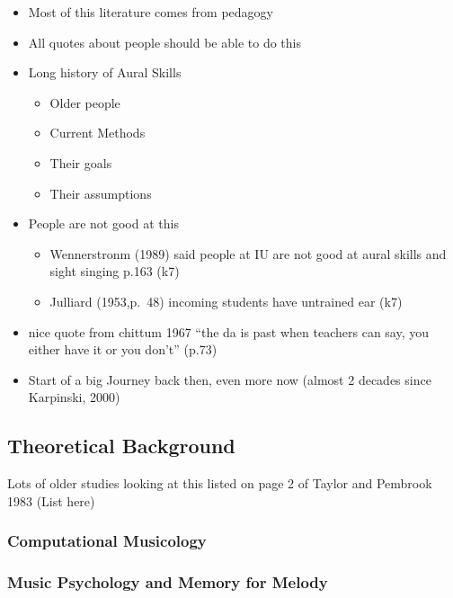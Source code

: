 \documentclass[]{book}
\providecommand{\tightlist}{%
  \setlength{\itemsep}{0pt}\setlength{\parskip}{0pt}}
\theoremstyle{definition}
\theoremstyle{definition}
\theoremstyle{definition}
\theoremstyle{remark}
\begin{document}
\begin{itemize}
\tightlist
\item
  Most of this literature comes from pedagogy
\item
  All quotes about people should be able to do this
\item
  Long history of Aural Skills

  \begin{itemize}
  \tightlist
  \item
    Older people
  \item
    Current Methods
  \item
    Their goals
  \item
    Their assumptions
  \end{itemize}
\item
  People are not good at this

  \begin{itemize}
  \tightlist
  \item
    Wennerstronm (1989) said people at IU are not good at aural skills
    and sight singing p.163 (k7)
  \item
    Julliard (1953,p.~48) incoming students have untrained ear (k7)
  \end{itemize}
\item
  nice quote from chittum 1967 ``the da is past when teachers can say,
  you either have it or you don't'' (p.73)
\item
  Start of a big Journey back then, even more now (almost 2 decades
  since Karpinski, 2000)
\end{itemize}

\hypertarget{theoretical-background}{%
\subsection{Theoretical Background}\label{theoretical-background}}

Lots of older studies looking at this listed on page 2 of Taylor and
Pembrook 1983 (List here)

\hypertarget{computational-musicology}{%
\subsubsection{Computational
Musicology}\label{computational-musicology}}

\hypertarget{music-psychology-and-memory-for-melody}{%
\subsubsection{Music Psychology and Memory for
Melody}\label{music-psychology-and-memory-for-melody}}
\end{document}
